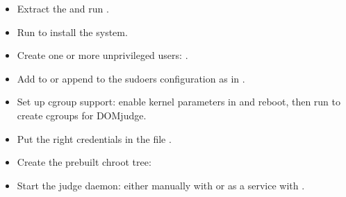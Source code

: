 \documentclass[a4paper,10pt,english,openany]{sphinxmanual}
\begin{document}
\label{\detokenize{quick-install:judgehosts}}\begin{itemize}
\item {} 
\sphinxAtStartPar
Extract the  and run
.

\item {} 
\sphinxAtStartPar
Run  to install the system.

\item {} 
\sphinxAtStartPar
Create one or more unprivileged users:
.

\item {} 
\sphinxAtStartPar
Add to  or append to  the
sudoers configuration as in .

\item {} 
\sphinxAtStartPar
Set up cgroup support: enable kernel parameters in
 and reboot, then run
 to create cgroups for DOMjudge.

\item {} 
\sphinxAtStartPar
Put the right credentials in the file .

\item {} 
\sphinxAtStartPar
Create the pre\sphinxhyphen{}built chroot tree: 

\item {} 
\sphinxAtStartPar
Start the judge daemon: either manually with 
or as a service with .

\end{itemize}
\end{document}
